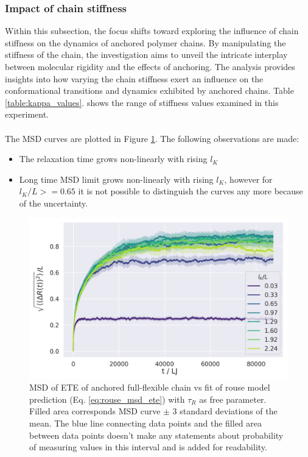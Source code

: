\documentclass[
    paper=A4,pagesize=automedia,fontsize=12pt,
    BCOR=15mm,DIV=22,
    twoside,headinclude,footinclude=false,
    ngerman,fleqn,             %
    bibliography=totocnumbered,          %
    listof=totoc,                %
    listof=flat,                 %
    cleardoublepage=empty      %
    numbers=endperiod
]{scrartcl}
\begin{document}
\subsubsection{Impact of chain stiffness}
Within this subsection, the focus shifts 
toward exploring the influence of chain stiffness on
the dynamics of anchored polymer chains. 
By manipulating the stiffness of the chain, the investigation aims to 
unveil the intricate interplay between molecular rigidity 
and the effects of anchoring. The analysis provides insights into 
how varying the chain stiffness exert an influence on the
conformational transitions and dynamics exhibited by anchored chains.
Table \ref{table:kappa_values}. shows the range of stiffness values examined
in this experiment.
\\
\\
The MSD curves are plotted in Figure \ref{fig:msd_anchored_l_K}.
The following observations are made:
\begin{itemize}
    \item The relaxation time grows non-linearly with rising $l_K$
    \item Long time MSD limit grows non-linearly with rising $l_K$,
    however for $l_K/L >= 0.65$ it is not possible to distinguish 
    the curves any more because of the uncertainty.
\end{itemize}

\begin{figure}[h]
    \begin{center}
      \includegraphics[width=\columnwidth,trim={0cm 0cm 0cm 0.0cm},clip]{4-exp-delta_R-bare.png}
      \caption{\label{fig:msd_anchored_l_K}
      MSD of ETE of anchored full-flexible chain vs fit of rouse model prediction 
      (Eq. \ref{eq:rouse_msd_ete}) with $\tau_R$ as free parameter.
      Filled area corresponds MSD curve $\pm$ 3 standard deviations of the mean. The
      blue line connecting data points and the filled area between data points doesn't make
      any statements about probability of measuring values in this interval and is
      added for readability.
      }
    \end{center}
\end{figure}
\end{document}
